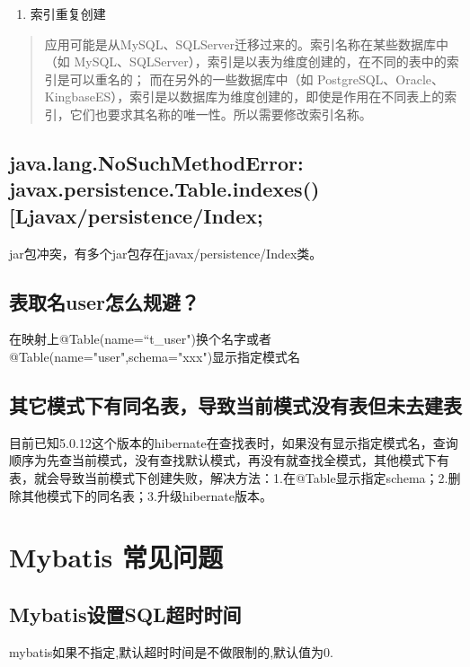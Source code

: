 \documentclass[a4,10pt,oneside,english]{sphinxmanual}
\begin{document}
\begin{enumerate}
%
\item {} 
索引重复创建

\end{enumerate}
\begin{quote}

应用可能是从MySQL、SQLServer迁移过来的。索引名称在某些数据库中（如 MySQL、SQLServer），索引是以表为维度创建的，在不同的表中的索引是可以重名的； 而在另外的一些数据库中（如 PostgreSQL、Oracle、KingbaseES），索引是以数据库为维度创建的，即使是作用在不同表上的索引，它们也要求其名称的唯一性。所以需要修改索引名称。
\end{quote}


\subsection{java.lang.NoSuchMethodError: javax.persistence.Table.indexes(){[}Ljavax/persistence/Index;}
\label{\detokenize{interface/hibernate:java-lang-nosuchmethoderror-javax-persistence-table-indexes-ljavax-persistence-index}}
jar包冲突，有多个jar包存在javax/persistence/Index类。


\subsection{表取名user怎么规避？}
\label{\detokenize{interface/hibernate:user}}
在映射上@Table(name=“t\_user")换个名字或者@Table(name="user",schema="xxx")显示指定模式名


\subsection{其它模式下有同名表，导致当前模式没有表但未去建表}
\label{\detokenize{interface/hibernate:id2}}
目前已知5.0.12这个版本的hibernate在查找表时，如果没有显示指定模式名，查询顺序为先查当前模式，没有查找默认模式，再没有就查找全模式，其他模式下有表，就会导致当前模式下创建失败，解决方法：1.在@Table显示指定schema；2.删除其他模式下的同名表；3.升级hibernate版本。


\section{Mybatis 常见问题}
\label{\detokenize{interface/mybatis:mybatis}}\label{\detokenize{interface/mybatis::doc}}

\subsection{Mybatis设置SQL超时时间}
\label{\detokenize{interface/mybatis:mybatissql}}
mybatis如果不指定,默认超时时间是不做限制的,默认值为0.
\end{document}
